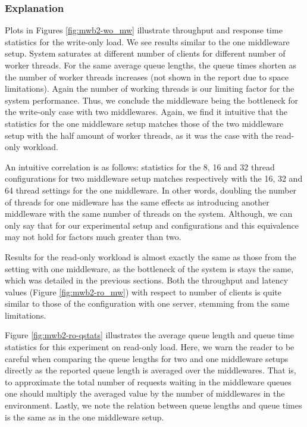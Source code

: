 \documentclass[11pt,a4paper]{article}
\begin{document}
\subsubsection{Explanation} \label{sec:mwb2-exp}
Plots in Figures \ref{fig:mwb2-wo_mw} illustrate throughput and response time statistics for the write-only load. We see results similar to the one middleware setup. System saturates at different number of clients for different number of worker threads. For the same average queue lengths, the queue times shorten as the number of worker threads increases (not shown in the report due to space limitations). Again the number of working threads is our limiting factor for the system performance. Thus, we conclude the middleware being the bottleneck for the write-only case with two middlewares. Again, we find it intuitive that the statistics for the one middleware setup matches those of the two middleware setup with the half amount of worker threads, as it was the case with the read-only workload.
\par An intuitive correlation is as follows: statistics for the 8, 16 and 32 thread configurations for two middleware setup matches respectively with the 16, 32 and 64 thread settings for the one middleware. In other words, doubling the number of threads for one midleware has the same effects as introducing another middleware with the same number of threads on the system. Although, we can only say that for our experimental setup and configurations and this equivalence may not hold for factors much greater than two.
\par Results for the read-only workload is almost exactly the same as those from the setting with one middleware, as the bottleneck of the system is stays the same, which was detailed in the previous sections. Both the throughput and latency values (Figure \ref{fig:mwb2-ro_mw}) with respect to number of clients is quite similar to those of the configuration with one server, stemming from the same limitations.
\par Figure \ref{fig:mwb2-ro-qstats} illustrates the average queue length and queue time statistics for this experiment on read-only load. Here, we warn the reader to be careful when comparing the queue lengths for two and one middleware setups directly as the reported queue length is averaged over the middlewares. That is, to approximate the total number of requests waiting in the middleware queues one should multiply the averaged value by the number of middlewares in the environment. Lastly, we note the relation between queue lengths and queue times is the same as in the one middleware setup.
\end{document}
